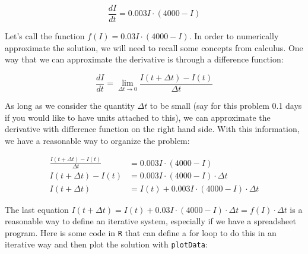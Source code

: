 \documentclass[
]{book}
\theoremstyle{definition}
\theoremstyle{definition}
\theoremstyle{definition}
\theoremstyle{remark}
\begin{document}
\[ \frac{dI}{dt} = 0.003 I \cdot (4000-I)  \]

Let's call the function \(f(I) = 0.03 I\cdot (4000-I)\). In order to numerically approximate the solution, we will need to recall some concepts from calculus. One way that we can approximate the derivative is through a difference function:

\[ \frac{dI}{dt} = \lim_{\Delta t \rightarrow 0} \frac{I(t+\Delta t) - I(t)}{\Delta t} \]

As long as we consider the quantity \(\Delta t\) to be small (say for this problem 0.1 days if you would like to have units attached to this), we can approximate the derivative with difference function on the right hand side. With this information, we have a reasonable way to organize the problem:

\begin{align*}
\frac{I(t+\Delta t) - I(t)}{\Delta t}  &= 0.003 I \cdot (4000-I) \\
I(t+\Delta t) - I(t)  &= 0.003 I \cdot (4000-I)  \cdot \Delta t \\
I(t+\Delta t) &= I(t) + 0.003 I \cdot (4000-I)  \cdot \Delta t
\end{align*}

The last equation \(I(t+\Delta t) = I(t) + 0.03 I \cdot (4000-I) \cdot \Delta t = f(I) \cdot \Delta t\) is a reasonable way to define an iterative system, especially if we have a spreadsheet program. Here is some code in \texttt{R} that can define a for loop to do this in an iterative way and then plot the solution with \texttt{plotData}:
\end{document}
